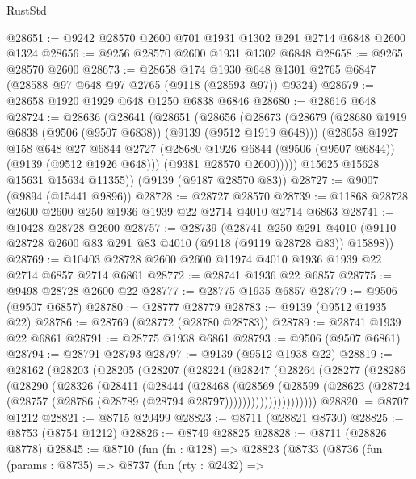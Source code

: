\begin{lexlean}{RustStd}
\begin{coremodule}
@28651 := @9242 @28570 @2600 @701 @1931 @1302 @291 @2714 @6848 @2600 @1324
@28656 := @9256 @28570 @2600 @1931 @1302 @6848
@28658 := @9265 @28570 @2600
@28673 := @28658
    @174
    @1930
    @648
    @1301
    @2765
    @6847
    (@28588 @97 @648 @97 @2765 (@9118 (@28593 @97)) @9324)
@28679 := @28658 @1920 @1929 @648 @1250 @6838 @6846
@28680 := @28616 @648
@28724 := @28636
    (@28641
      (@28651
        (@28656
          (@28673
            (@28679
              (@28680 @1919 @6838 (@9506 (@9507 @6838)) (@9139 (@9512 @1919 @648)))
              (@28658
                @1927
                @158
                @648
                @27
                @6844
                @2727
                (@28680 @1926 @6844 (@9506 (@9507 @6844)) (@9139 (@9512 @1926 @648)))
                (@9381 @28570 @2600)))))
        @15625
        @15628
        @15631
        @15634
        @11355))
    (@9139 (@9187 @28570 @83))
@28727 := @9007 (@9894 (@15441 @9896))
@28728 := @28727 @28570
@28739 := @11868 @28728 @2600 @2600 @250 @1936 @1939 @22 @2714 @4010 @2714 @6863
@28741 := @10428 @28728 @2600
@28757 := @28739
    (@28741
      @250
      @291
      @4010
      (@9110 @28728 @2600 @83 @291 @83 @4010 (@9118 (@9119 @28728 @83)) @15898))
@28769 := @10403 @28728 @2600 @2600 @11974 @4010 @1936 @1939 @22 @2714 @6857 @2714 @6861
@28772 := @28741 @1936 @22 @6857
@28775 := @9498 @28728 @2600 @22
@28777 := @28775 @1935 @6857
@28779 := @9506 (@9507 @6857)
@28780 := @28777 @28779
@28783 := @9139 (@9512 @1935 @22)
@28786 := @28769 (@28772 (@28780 @28783))
@28789 := @28741 @1939 @22 @6861
@28791 := @28775 @1938 @6861
@28793 := @9506 (@9507 @6861)
@28794 := @28791 @28793
@28797 := @9139 (@9512 @1938 @22)
@28819 := @28162
    (@28203
      (@28205
        (@28207
          (@28224
            (@28247
              (@28264
                (@28277
                  (@28286
                    (@28290
                      (@28326
                        (@28411
                          (@28444
                            (@28468
                              (@28569
                                (@28599
                                  (@28623
                                    (@28724
                                      (@28757 (@28786 (@28789 (@28794 @28797)))))))))))))))))))))
@28820 := @8707 @1212
@28821 := @8715 @20499
@28823 := @8711 (@28821 @8730)
@28825 := @8753 (@8754 @1212)
@28826 := @8749 @28825
@28828 := @8711 (@28826 @8778)
@28845 := @8710
    (fun (fn : @128) =>
    @28823
      (@8733
        (@8736
          (fun (params : @8735) =>
          @8737
            (fun (rty : @2432) =>

\end{coremodule}
\end{lexlean}
